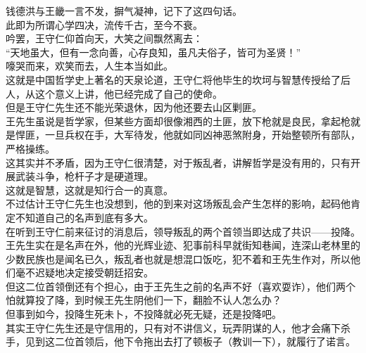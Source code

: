 \begin{multicols}{\theparacolNo}
钱德洪与王畿一言不发，摒气凝神，记下了这四句话。\\

此即为所谓心学四决，流传千古，至今不衰。\\

吟罢，王守仁仰首向天，大笑之间飘然离去：\\

“天地虽大，但有一念向善，心存良知，虽凡夫俗子，皆可为圣贤！”\\

嚎哭而来，欢笑而去，人生本当如此。\\

这就是中国哲学史上著名的天泉论道，王守仁将他毕生的坎坷与智慧传授给了后人，从这个意义上讲，他已经完成了自己的使命。\\

但是王守仁先生还不能光荣退休，因为他还要去山区剿匪。\\

王先生虽说是哲学家，但某些方面却很像湘西的土匪，放下枪就是良民，拿起枪就是悍匪，一旦兵权在手，大军待发，他就如同凶神恶煞附身，开始整顿所有部队，严格操练。\\

这其实并不矛盾，因为王守仁很清楚，对于叛乱者，讲解哲学是没有用的，只有开展武装斗争，枪杆子才是硬道理。\\

这就是智慧，这就是知行合一的真意。\\

不过估计王守仁先生也没想到，他的到来对这场叛乱会产生怎样的影响，起码他肯定不知道自己的名声到底有多大。\\

在听到王守仁前来征讨的消息后，领导叛乱的两个首领当即达成了共识——投降。\\

王先生实在是名声在外，他的光辉业迹、犯事前科早就街知巷闻，连深山老林里的少数民族也是闻名已久，叛乱者也就是想混口饭吃，犯不着和王先生作对，所以他们毫不迟疑地决定接受朝廷招安。\\

但这二位首领倒还有个担心，由于王先生之前的名声不好（喜欢耍诈），他们两个怕就算投了降，到时候王先生阴他们一下，翻脸不认人怎么办？\\

但事到如今，投降生死未卜，不投降就必死无疑，还是投降吧。\\

其实王守仁先生还是守信用的，只有对不讲信义，玩弄阴谋的人，他才会痛下杀手，见到这二位首领后，他下令拖出去打了顿板子（教训一下），就履行了诺言。\\


\end{multicols}

